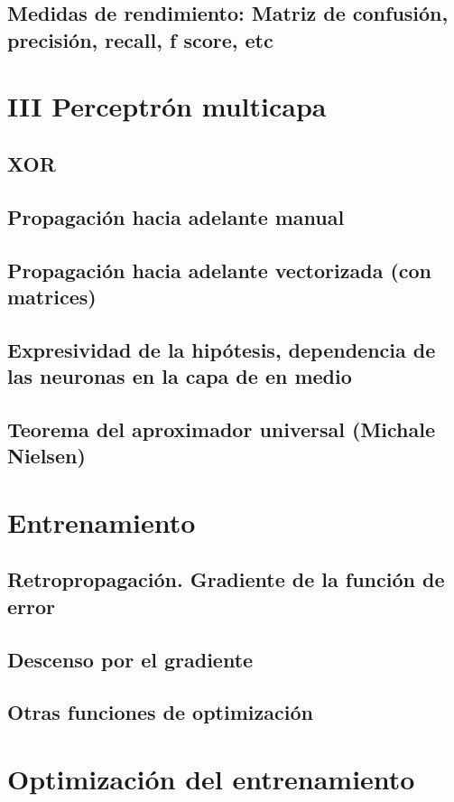 \documentclass[12pt,openany]{book}
\begin{document}
\section{Medidas de rendimiento: Matriz de confusión, precisión, recall, f score, etc}

\chapter{III Perceptrón multicapa} %
\section{XOR}
\section{Propagación hacia adelante manual}
\section{Propagación hacia adelante vectorizada (con matrices)}
\section{Expresividad de la hipótesis, dependencia de las neuronas en la capa de en medio}
\section{Teorema del aproximador universal (Michale Nielsen)}

\chapter{Entrenamiento} %
\section{Retropropagación. Gradiente de la función de error}
\section{Descenso por el gradiente}
\section{Otras funciones de optimización}

\chapter{Optimización del entrenamiento}%
\end{document}
